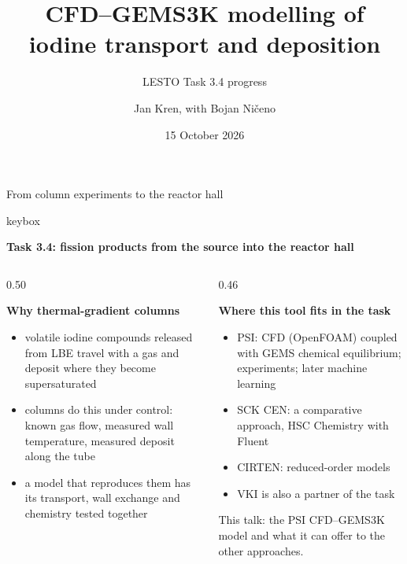 \documentclass[aspectratio=169,10pt]{beamer}
\title{CFD--GEMS3K modelling of\\iodine transport and deposition}
\subtitle{LESTO Task 3.4 progress}
\author{Jan Kren, with Bojan Ničeno}
\institute{LESTO Task 3.4 \enspace | \enspace Villigen PSI}
\date{15 October 2026}
\newcommand{\subhead}[1]{{\normalsize\bfseries\color{PSIblack}#1\par}\vspace{0.15em}}
\newcommand{\key}[1]{\begin{beamercolorbox}[sep=0.35em,wd=\linewidth]{keybox}\small\raggedright\textbf{#1}\end{beamercolorbox}\vspace{0.3em}}
\begin{document}
{
\begin{frame}[plain]
  \titlepage
\end{frame}}

\begin{frame}[t]{From column experiments to the reactor hall}
  \key{Task 3.4: fission products from the source into the reactor hall}
  \begin{columns}[T,onlytextwidth]
    \begin{column}{0.50\textwidth}
      \subhead{Why thermal-gradient columns}
      \begin{itemize}
        \item volatile iodine compounds released from LBE travel with a gas and deposit where they become supersaturated
        \item columns do this under control: known gas flow, measured wall temperature, measured deposit along the tube
        \item a model that reproduces them has its transport, wall exchange and chemistry tested together
      \end{itemize}
    \end{column}
    \begin{column}{0.46\textwidth}
      \subhead{Where this tool fits in the task}
      \begin{itemize}
        \item PSI: CFD (OpenFOAM) coupled with GEMS chemical equilibrium; experiments; later machine learning
        \item SCK CEN: a comparative approach, HSC Chemistry with Fluent
        \item CIRTEN: reduced-order models
        \item VKI is also a partner of the task
      \end{itemize}
      {\small\color{PSIgray}This talk: the PSI CFD--GEMS3K model and what it can offer to the other approaches.\par}
    \end{column}

\end{columns}
\end{frame}
\end{document}
